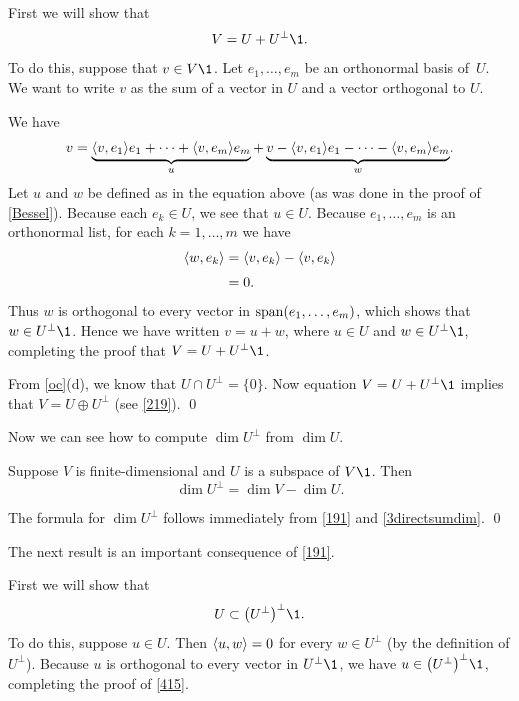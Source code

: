 \proof
First we will show that
\[
V = U + U^\perp\1.
\]
To do this, suppose that $v \in V\1$.  Let $e_1, \dots, e_m$ be an orthonormal basis of~$U$. We want to write $v$ as the sum of a vector in $U$ and a vector orthogonal to $U$.

\pagebreak[3]

We have
\begin{equation} \label{416}
v = \underbrace{\langle v, e_1\rangle e_1 + \dots + \langle v, e_m\rangle e_m}_u
+ \underbrace{v - \langle v, e_1\rangle e_1 - \dots - \langle v, e_m\rangle e_m}_w\!.
\end{equation}%
Let $u$ and $w$ be defined as in the equation above (as was done in the proof of \ref{Bessel}). Because each $e_k \in U$, we see that $u \in U$.  Because $e_1, \dots, e_m$ is an orthonormal
list, for each $k = 1, \dots, m$ we have
\begin{align*}
\langle w, e_k\rangle &= \langle v, e_k\rangle - \langle v, e_k\rangle \\[3bp]
&= 0.
\end{align*}
Thus $w$ is orthogonal to every vector in $\operatorname{span}(e_1, \dots, e_m)$, which shows that $w \in U^\perp\1$. Hence we have written
$v = u + w$, where $u \in U$ and $w \in U^\perp\1$, completing the proof that $V = U + U^\perp\1$.

From \ref{oc}(d), we know that $U \cap U^\perp = \{0\}$. Now equation $V = U + U^\perp\1$ implies that $V = U \oplus U^\perp$ (see \ref{219}).
\qed

Now we can see how to compute $\dim U^\perp$ from $\dim U$.

{Suppose $V$ is finite-dimensional and $U$ is a subspace of $V\1$. Then
\[
\dim U^\perp = \dim V - \dim U.
\]}

\proof
The formula for $\dim U^\perp$ follows immediately from \ref{191} and \ref{3directsumdim}. \qed

The next result is an important consequence of \ref{191}.


\proof
First we will show that
\begin{equation} \label{415}
U \subset \paren[\big]{U^\perp}^\perp\1.
\end{equation}%
To do this, suppose $u \in U$.  Then $\langle u, w\rangle = 0$ for every $w \in U^\perp$ \big(by the definition of $U^\perp$\big).  Because $u$ is
orthogonal to every vector in $U^\perp\1$, we have $u \in \paren[\big]{U^\perp}^\perp\1$, completing the proof of \ref{415}.

